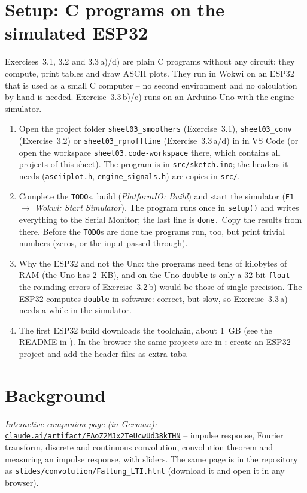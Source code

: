 \section*{Setup: C programs on the simulated ESP32}
Exercises~3.1, 3.2 and 3.3\,a)/d) are plain C programs without any circuit:
they compute, print tables and draw ASCII plots. They run in Wokwi on an ESP32
that is used as a small C computer -- no second environment and no calculation
by hand is needed. Exercise~3.3\,b)/c) runs on an Arduino Uno with the
engine simulator.
\begingroup\sloppy
\begin{enumerate}
  \item Open the project folder \texttt{sheet03\_smoothers} (Exercise~3.1),
    \texttt{sheet03\_conv} (Exercise~3.2) or \texttt{sheet03\_rpmoffline}
    (Exercise~3.3\,a/d) in  in VS Code (or open the
    workspace \texttt{sheet03.code-workspace} there, which contains all
    projects of this sheet). The program is in \texttt{src/sketch.ino}; the
    headers it needs (\texttt{asciiplot.h}, \texttt{engine\_signals.h}) are
    copies in \texttt{src/}.
  \item Complete the \texttt{TODO}s, build (\emph{PlatformIO: Build}) and start
    the simulator (\texttt{F1} $\to$ \emph{Wokwi: Start Simulator}). The
    program runs once in \texttt{setup()} and writes everything to the Serial
    Monitor; the last line is \texttt{done.} Copy the results from there.
    Before the \texttt{TODO}s are done the programs run, too, but print
    trivial numbers (zeros, or the input passed through).
  \item Why the ESP32 and not the Uno: the programs need tens of kilobytes of
    RAM (the Uno has \SI{2}{KB}), and on the Uno \texttt{double} is only a
    32-bit \texttt{float} -- the rounding errors of Exercise~3.2\,b) would be
    those of single precision. The ESP32 computes \texttt{double} in software:
    correct, but slow, so Exercise~3.3\,a) needs a while in the simulator.
  \item The first ESP32 build downloads the toolchain, about \SI{1}{GB}
    (see the README in ). In the browser the same
    projects are in : create an ESP32 project and add the
    header files as extra tabs.
\end{enumerate}
\endgroup

\section*{Background}
\emph{Interactive companion page (in German):}
\href{https://claude.ai/artifact/EAoZ2MJx2TeUcwUd38kTHN}{\texttt{claude.ai/artifact/EAoZ2MJx2TeUcwUd38kTHN}}
-- impulse response, Fourier transform, discrete and continuous convolution,
convolution theorem and measuring an impulse response, with sliders. The same
page is in the repository as
\texttt{slides/\allowbreak convolution/\allowbreak Faltung\_LTI.html}
(download it and open it in any browser).

